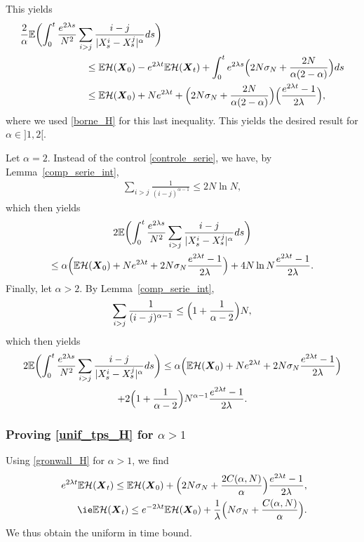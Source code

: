 \documentclass[10pt]{amsart}
\newcommand{\bX}{{\boldsymbol{X}}}
\theoremstyle{plain}
\theoremstyle{definition}
\begin{document}
This yields
\begin{align*}
\frac{2}{\alpha}\mathbb{E}\biggl(\int_0^t\frac{e^{2\lambda s}}{N^2}&\sum_{i>j}\frac{i-j}{|X^i_s-X^j_s|^{\alpha}}ds\biggr)\\
&\hspace{0.3cm}\leq\mathbb{E}\mathcal{H}(\bX_0)-e^{2\lambda t}\mathbb{E}\mathcal{H}(\bX_t)+\int_0^te^{2\lambda s}\Bigl(2N\sigma_N+\frac{2N}{\alpha(2-\alpha)}\Bigr)ds\\
&\hspace{0.3cm}\leq\mathbb{E}\mathcal{H}(\bX_0)+Ne^{2\lambda t}+\Bigl(2N\sigma_N+\frac{2N}{\alpha(2-\alpha)}\Bigr)\Bigl(\frac{e^{2\lambda t}-1}{2\lambda}\Bigr),
\end{align*}
where we used \eqref{borne_H} for this last inequality.
This yields the desired result for $\alpha\in{}]1,2[$.

Let $\alpha=2$. Instead of the control \eqref{controle_serie}, we have, by Lemma~\ref{comp_serie_int},
\begin{align*}
\sum_{i>j}\frac{1}{(i-j)^{\alpha-1}}\leq 2N\ln N,
\end{align*}
which then yields
\begin{multline*}
2\mathbb{E}\biggl(\int_0^t\frac{e^{2\lambda s}}{N^2}\sum_{i>j}\frac{i-j}{|X^i_s-X^j_s|^{\alpha}}ds\biggr)
\\
\leq \alpha\Bigl(\mathbb{E}\mathcal{H}(\bX_0)+Ne^{2\lambda t}+2N\sigma_N \frac{e^{2\lambda t}-1}{2\lambda}\Bigr)+4N\ln N\frac{e^{2\lambda t}-1}{2\lambda}.\\
\end{multline*}
Finally, let $\alpha>2$. By Lemma~\ref{comp_serie_int},
\begin{align*}
\sum_{i>j}\frac{1}{(i-j)^{\alpha-1}}\leq \Bigl(1+\frac{1}{\alpha-2}\Bigr)N,
\end{align*}
which then yields
\begin{multline*}
2\mathbb{E}\biggl(\int_0^t\frac{e^{2\lambda s}}{N^2}\sum_{i>j}\frac{i-j}{|X^i_s-X^j_s|^{\alpha}}ds\biggr)\leq\alpha\Bigl(\mathbb{E}\mathcal{H}(\bX_0)+Ne^{2\lambda t}+2N\sigma_N \frac{e^{2\lambda t}-1}{2\lambda}\Bigr)\\
+2\Bigl(1+\frac{1}{\alpha-2}\Bigr)N^{\alpha-1}\frac{e^{2\lambda t}-1}{2\lambda}.
\end{multline*}

\subsubsection*{Proving \eqref{unif_tps_H} for $\alpha>1$} Using \eqref{gronwall_H} for $\alpha>1$, we find
\begin{align*}
e^{2\lambda t}\mathbb{E}\mathcal{H}(\bX_t)\leq\mathbb{E}\mathcal{H}(\bX_0)+\Bigl(2N\sigma_N+\frac{2C(\alpha,N)}{\alpha}\Bigr)\frac{e^{2\lambda t}-1}{2\lambda },
\\
\tag*{\ie}
\mathbb{E}\mathcal{H}(\bX_t)\leq e^{-2\lambda t}\mathbb{E}\mathcal{H}(\bX_0)+\frac{1}{\lambda }\Bigl(N\sigma_N+\frac{C(\alpha,N)}{\alpha}\Bigr).
\end{align*}
We thus obtain the uniform in time bound.
\end{document}
